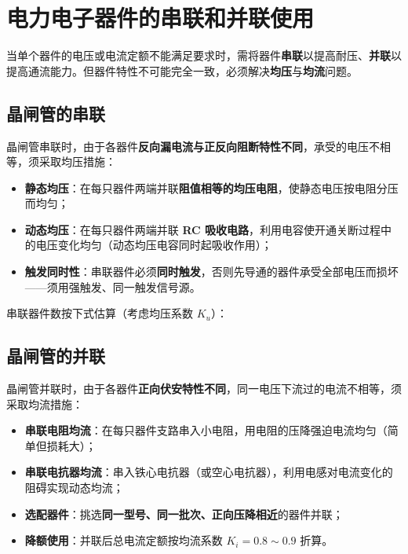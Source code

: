 \section{电力电子器件的串联和并联使用}

当单个器件的电压或电流定额不能满足要求时，需将器件\textbf{串联}以提高耐压、\textbf{并联}以提高通流能力。但器件特性不可能完全一致，必须解决\textbf{均压}与\textbf{均流}问题。

\subsection{晶闸管的串联}

晶闸管串联时，由于各器件\textbf{反向漏电流与正反向阻断特性不同}，承受的电压不相等，须采取均压措施：

\begin{itemize}
  \item \textbf{静态均压}：在每只器件两端并联\textbf{阻值相等的均压电阻}，使静态电压按电阻分压而均匀；
  \item \textbf{动态均压}：在每只器件两端并联 \textbf{RC 吸收电路}，利用电容使开通关断过程中的电压变化均匀（动态均压电容同时起吸收作用）；
  \item \textbf{触发同时性}：串联器件必须\textbf{同时触发}，否则先导通的器件承受全部电压而损坏——须用强触发、同一触发信号源。
\end{itemize}

串联器件数按下式估算（考虑均压系数 $K_u$）：


\subsection{晶闸管的并联}

晶闸管并联时，由于各器件\textbf{正向伏安特性不同}，同一电压下流过的电流不相等，须采取均流措施：

\begin{itemize}
  \item \textbf{串联电阻均流}：在每只器件支路串入小电阻，用电阻的压降强迫电流均匀（简单但损耗大）；
  \item \textbf{串联电抗器均流}：串入铁心电抗器（或空心电抗器），利用电感对电流变化的阻碍实现动态均流；
  \item \textbf{选配器件}：挑选\textbf{同一型号、同一批次、正向压降相近}的器件并联；
  \item \textbf{降额使用}：并联后总电流定额按均流系数 $K_i=0.8\sim0.9$ 折算。
\end{itemize}

